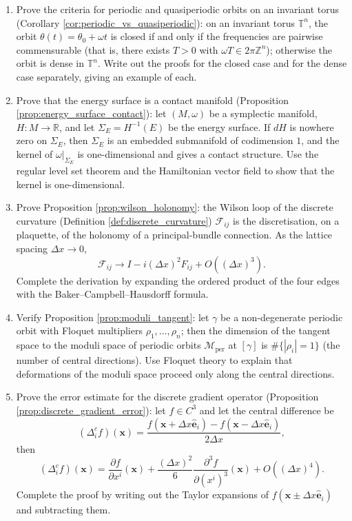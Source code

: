 \begin{enumerate}[leftmargin=3em, label=\textbf{Exercise \arabic*}]
    \item Prove the criteria for periodic and quasiperiodic orbits on an invariant torus (Corollary \ref{cor:periodic_vs_quasiperiodic}):
    on an invariant torus $\mathbb{T}^n$, the orbit $\theta(t)=\theta_0+\omega t$
    is closed if and only if the frequencies are pairwise commensurable (that is, there exists $T>0$ with $\omega T\in2\pi\mathbb{Z}^n$);
    otherwise the orbit is dense in $\mathbb{T}^n$.
    Write out the proofs for the closed case and for the dense case separately, giving an example of each.

    \item Prove that the energy surface is a contact manifold (Proposition \ref{prop:energy_surface_contact}):
    let $(M,\omega)$ be a symplectic manifold, $H:M\to\mathbb{R}$, and let $\Sigma_E=H^{-1}(E)$ be the energy surface.
    If $dH$ is nowhere zero on $\Sigma_E$, then $\Sigma_E$ is an embedded submanifold of codimension $1$,
    and the kernel of $\omega|_{\Sigma_E}$ is one-dimensional and gives a contact structure.
    Use the regular level set theorem and the Hamiltonian vector field to show that the kernel is one-dimensional.

    \item Prove Proposition \ref{prop:wilson_holonomy}:
    the Wilson loop of the discrete curvature (Definition \ref{def:discrete_curvature})
    $\mathcal{F}_{ij}$ is the discretisation, on a plaquette, of the holonomy of a principal-bundle connection.
    As the lattice spacing $\Delta x\to0$,
    \[
    \mathcal{F}_{ij}\to I-i(\Delta x)^2F_{ij}+O((\Delta x)^3).
    \]
    Complete the derivation by expanding the ordered product of the four edges with the Baker--Campbell--Hausdorff formula.

    \item Verify Proposition \ref{prop:moduli_tangent}:
    let $\gamma$ be a non-degenerate periodic orbit with Floquet multipliers $\rho_1,\dots,\rho_n$;
    then the dimension of the tangent space to the moduli space of periodic orbits $\mathcal{M}_{\text{per}}$ at $[\gamma]$
    is $\#\{|\rho_i|=1\}$ (the number of central directions).
    Use Floquet theory to explain that deformations of the moduli space proceed only along the central directions.

    \item Prove the error estimate for the discrete gradient operator (Proposition \ref{prop:discrete_gradient_error}):
    let $f\in C^3$ and let the central difference be
    \[
    (\Delta_i^cf)(\mathbf{x})
    =\frac{f(\mathbf{x}+\Delta x\hat{\mathbf{e}}_i)-f(\mathbf{x}-\Delta x\hat{\mathbf{e}}_i)}{2\Delta x},
    \]
    then
    \[
    (\Delta_i^cf)(\mathbf{x})
    =\frac{\partial f}{\partial x^i}(\mathbf{x})
    +\frac{(\Delta x)^2}{6}\frac{\partial^3f}{\partial(x^i)^3}(\mathbf{x})
    +O((\Delta x)^4).
    \]
    Complete the proof by writing out the Taylor expansions of $f(\mathbf{x}\pm\Delta x\hat{\mathbf{e}}_i)$ and subtracting them.


\end{enumerate}
